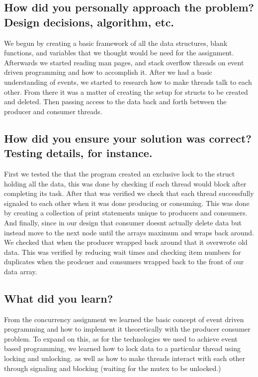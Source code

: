 \documentclass[letterpaper,10pt,titlepage]{IEEEtran}
\begin{document}
  \subsection{How did you personally approach the problem? Design decisions, algorithm, etc.}
  We begun by creating a basic framework of all the data structures, blank functions, and variables that we thought would be need for the assignment. Afterwards we started reading man pages, and stack overflow threads on event driven programming and how to accomplish it. After we had a basic understanding of events, we started to research how to make threads talk to each other. From there it was a matter of creating the setup for structs to be created and deleted. Then passing access to the data back and forth between the producer and consumer threads.
  \subsection{How did you ensure your solution was correct? Testing details, for instance.}
  First we tested the that the program created an exclusive lock to the struct holding all the data, this was done by checking if each thread would block after completing its task. After that was verified we check that each thread successfully signaled to each other when it was done producing or consuming. This was done by creating a collection of print statements unique to producers and consumers. And finally, since in our design that consumer doesnt actually delete data but instead move to the next node until the arrays maximum and wraps back around. We checked that when the producer wrapped back around that it overwrote old data. This was verified by reducing wait times and checking item numbers for duplicates when the prodcuer and consumers wrapped back to the front of our data array.
  \subsection{What did you learn?}
  From the concurrency assignment we learned the basic concept of event driven programming and how to implement it theoretically with the producer consumer problem. To expand on this, as for the technologies we used to achieve event based programming, we learned how to lock data to a particular thread using locking and unlocking. as well as how to make threads interact with each other through signaling and blocking (waiting for the mutex to be unlocked.)
\end{document}
